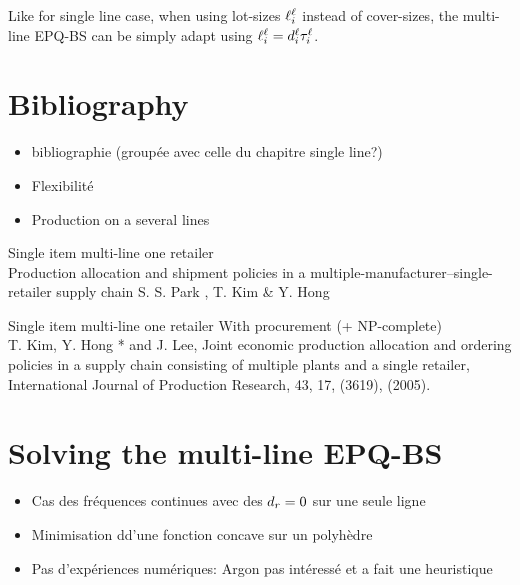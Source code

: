 Like for single line case, when using lot-sizes $\ell_i^{\ell}$ instead of cover-sizes, the multi-line EPQ-BS can be simply adapt using $\ell_i^{\ell}=d_i^{\ell}\tau_i^{\ell}$.



\section{Bibliography}

\begin{itemize}
  \item bibliographie (groupée avec celle du chapitre single line?)
  \item Flexibilité
  \item Production on a several lines
\end{itemize}


Single item multi-line one retailer\\
Production allocation and shipment policies in a multiple-manufacturer–single-retailer supply chain
S. S. Park , T. Kim \& Y. Hong 


Single item multi-line one retailer With procurement (+ NP-complete)\\
T. Kim, Y. Hong * and J. Lee, Joint economic production allocation and ordering policies in a supply chain consisting of multiple plants and a single retailer, International Journal of Production Research, 43, 17, (3619), (2005).



\section{Solving the multi-line EPQ-BS}

\begin{itemize}
  \item Cas des fréquences continues avec des $d_r=0$ sur une seule ligne
  \item Minimisation dd'une fonction concave sur un polyhèdre
  \item Pas d'expériences numériques: Argon pas intéressé et a fait une heuristique
\end{itemize}



